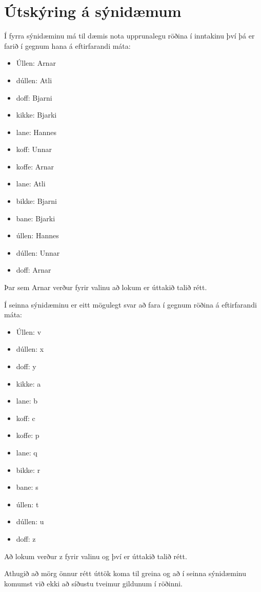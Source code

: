 \section*{Útskýring á sýnidæmum}
Í fyrra sýnidæminu má til dæmis nota upprunalegu röðina í inntakinu því þá er farið í gegnum hana á eftirfarandi máta:

\begin{itemize}
    \item Úllen: Arnar
    \item dúllen: Atli
    \item doff: Bjarni
    \item kikke: Bjarki
    \item lane: Hannes
    \item koff: Unnar
    \item koffe: Arnar
    \item lane: Atli
    \item bikke: Bjarni
    \item bane: Bjarki
    \item úllen: Hannes
    \item dúllen: Unnar
    \item doff: Arnar
\end{itemize}

Þar sem Arnar verður fyrir valinu að lokum er úttakið talið rétt.

Í seinna sýnidæminu er eitt mögulegt svar að fara í gegnum röðina á eftirfarandi máta:
\begin{itemize}
    \item Úllen: v
    \item dúllen: x
    \item doff: y
    \item kikke: a
    \item lane: b
    \item koff: c
    \item koffe: p
    \item lane: q
    \item bikke: r
    \item bane: s
    \item úllen: t
    \item dúllen: u
    \item doff: z
\end{itemize}

Að lokum verður z fyrir valinu og því er úttakið talið rétt.

Athugið að mörg önnur rétt úttök koma til greina og að í seinna sýnidæminu komumst við ekki að síðustu tveimur gildunum í röðinni.
